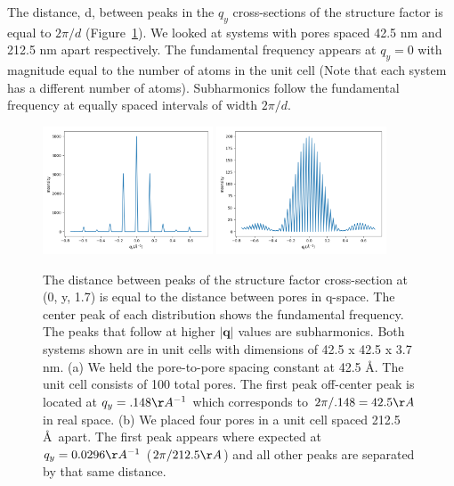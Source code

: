 \documentclass{article}
\begin{document}
  The distance, d, between peaks in the $q_y$ cross-sections of the structure
  factor is equal to $2\pi / d$ (Figure~\ref{fig:p2p_rpi}). We looked at systems
  with pores spaced 42.5 nm and 212.5 nm apart respectively.  The fundamental
  frequency appears at $q_y=0$ with magnitude equal to the number of atoms in the
  unit cell (Note that each system has a different number of atoms). Subharmonics
  follow the fundamental frequency at equally spaced intervals of width $2\pi /
  d$. 

  \begin{figure}[!htb]
  \centering
  \includegraphics[width=0.45\textwidth]{constant_p2p.png}
  \includegraphics[width=0.45\textwidth]{constant_npores.png}
  \caption{The distance between peaks of the structure factor cross-section at
  (0, y, 1.7) is equal to the distance between pores in q-space. The center 
  peak of each distribution shows the fundamental frequency. The peaks
  that follow at higher $\left|\mathbf{q}\right|$ values are subharmonics. Both systems
  shown are in unit cells with dimensions of 42.5 x 42.5 x 3.7 nm. (a) We held
  the pore-to-pore spacing constant at 42.5 \AA. The unit cell consists of 100
  total pores. The first peak off-center peak is located at $q_y = .148 \AA^{-1}$
  which corresponds to $2\pi / .148 = 42.5 \AA$ in real space. (b) We placed four
  pores in a unit cell spaced 212.5 \AA~apart. The first peak appears where
  expected at $q_y = 0.0296 \AA^{-1}$ ($2\pi / 212.5 \AA$) and all other peaks
  are separated by that same distance.
  }\label{fig:p2p_rpi}
  \end{figure}
\end{document}
